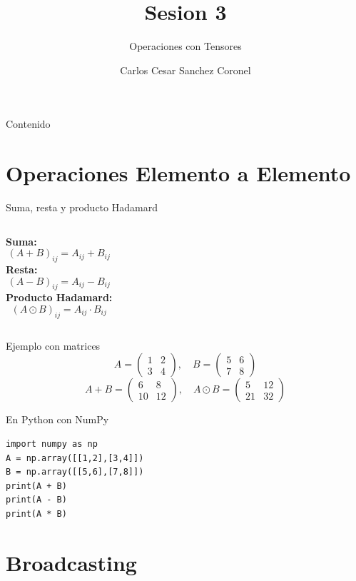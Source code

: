 \documentclass[aspectratio=169, 10pt, xcolor=table]{beamer}
\title[SESION 3 CALCULO]{\textbf{Sesion 3}}
\subtitle{Operaciones con Tensores}
\author[Prof. C. Sanchez]{Carlos Cesar Sanchez Coronel}
\institute{\textbf{CALCULO Y ALGEBRA LINEAL PARA IA}}
\date{}
\begin{document}
\begin{frame}
    \titlepage
\end{frame}

\begin{frame}{Contenido}
    \tableofcontents
\end{frame}

\section{Operaciones Elemento a Elemento}

\begin{frame}{Suma, resta y producto Hadamard}
    \begin{columns}[t]
        \textbf{Suma:}
        \[ (A+B)_{ij} = A_{ij} + B_{ij} \]
        \textbf{Resta:}
        \[ (A-B)_{ij} = A_{ij} - B_{ij} \]
        \textbf{Producto Hadamard:}
        \[ (A \odot B)_{ij} = A_{ij} \cdot B_{ij} \]
    \end{columns}
    \vspace{0.3cm}
    \begin{exampleblock}{Ejemplo con matrices}
        \[ A = \begin{pmatrix}1&2\\3&4\end{pmatrix},\quad B = \begin{pmatrix}5&6\\7&8\end{pmatrix} \]
        \[ A+B = \begin{pmatrix}6&8\\10&12\end{pmatrix},\quad A\odot B = \begin{pmatrix}5&12\\21&32\end{pmatrix} \]
    \end{exampleblock}
\end{frame}

\begin{frame}[fragile]{En Python con NumPy}
\begin{lstlisting}
import numpy as np
A = np.array([[1,2],[3,4]])
B = np.array([[5,6],[7,8]])
print(A + B)
print(A - B)
print(A * B)
\end{lstlisting}
\end{frame}

\section{Broadcasting}
\end{document}
